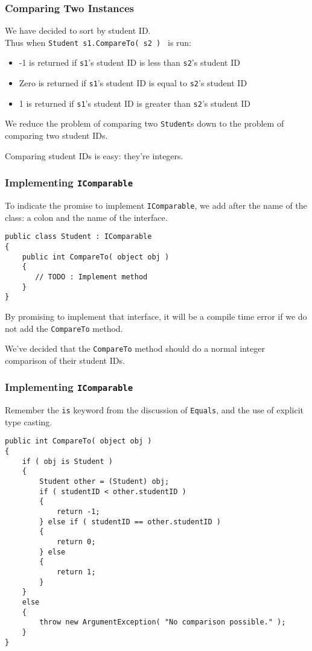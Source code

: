 \begin{frame}
\frametitle{Comparing Two Instances}

We have decided to sort by student ID.\\
\quad Thus when \texttt{Student s1.CompareTo( s2 ) } is run:

\begin{itemize}
	\item -1 is returned if \texttt{s1}'s student ID is less than \texttt{s2}'s student ID
	\item Zero is returned if \texttt{s1}'s student ID is equal to \texttt{s2}'s student ID
	\item 1 is returned if \texttt{s1}'s student ID is greater than \texttt{s2}'s student ID
\end{itemize}

We reduce the problem of comparing two \texttt{Student}s down to the problem of comparing two student IDs.

Comparing student IDs is easy: they're integers.

\end{frame}


\begin{frame}[fragile]
\frametitle{Implementing \texttt{IComparable}}

To indicate the promise to implement \texttt{IComparable}, we add after the name of the class: a colon and the name of the interface.

\begin{verbatim}
public class Student : IComparable
{
    public int CompareTo( object obj )
    {
       // TODO : Implement method
    }
}
\end{verbatim}

By promising to implement that interface, it will be a compile time error if we do not add the \texttt{CompareTo} method.

We've decided that the \texttt{CompareTo} method should do a normal integer comparison of their student IDs.

\end{frame}

\begin{frame}[fragile]
\frametitle{Implementing \texttt{IComparable}}

Remember the \texttt{is} keyword from the discussion of \texttt{Equals}, and the use of explicit type casting.

{\scriptsize
\begin{verbatim}
public int CompareTo( object obj )
{
    if ( obj is Student )
    {
        Student other = (Student) obj;
        if ( studentID < other.studentID )
        {
            return -1;
        } else if ( studentID == other.studentID )
        {
            return 0;
        } else
        {
            return 1;
        }
    }
    else
    {
        throw new ArgumentException( "No comparison possible." ); 
    }
}
\end{verbatim}
}
\end{frame}

